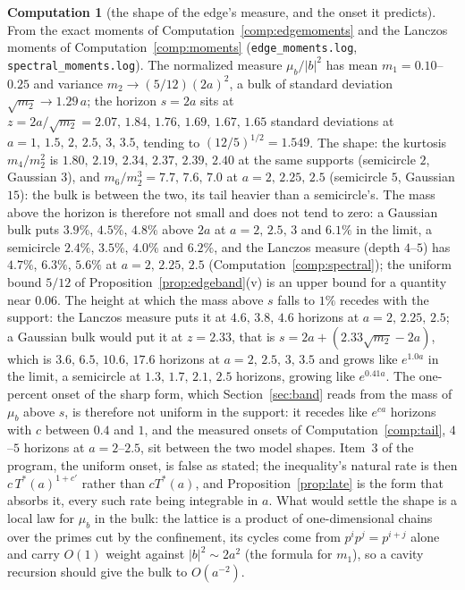 \documentclass[11pt]{article}
\theoremstyle{definition}
\newtheorem{computation}[theorem]{Computation}
\theoremstyle{remark}
\newcommand{\Tst}{T^{*}}
\begin{document}
\begin{computation}[the shape of the edge's measure, and the onset it predicts]\label{comp:shape}
From the exact moments of Computation~\ref{comp:edgemoments} and the Lanczos moments of Computation~\ref{comp:moments} (\texttt{edge\_moments.log}, \texttt{spectral\_moments.log}). The normalized measure $\mu_b/|b|^2$ has mean $m_1=0.10$--$0.25$ and variance $m_2\to(5/12)(2a)^2$, a bulk of standard deviation $\sqrt{m_2}\to1.29\,a$; the horizon $s=2a$ sits at $z=2a/\sqrt{m_2}=2.07,\,1.84,\,1.76,\,1.69,\,1.67,\,1.65$ standard deviations at $a=1,\,1.5,\,2,\,2.5,\,3,\,3.5$, tending to $(12/5)^{1/2}=1.549$. The shape: the kurtosis $m_4/m_2^2$ is $1.80,\,2.19,\,2.34,\,2.37,\,2.39,\,2.40$ at the same supports (semicircle $2$, Gaussian $3$), and $m_6/m_2^3=7.7,\,7.6,\,7.0$ at $a=2,\,2.25,\,2.5$ (semicircle $5$, Gaussian $15$): the bulk is between the two, its tail heavier than a semicircle's. The mass above the horizon is therefore not small and does not tend to zero: a Gaussian bulk puts $3.9\%$, $4.5\%$, $4.8\%$ above $2a$ at $a=2,\,2.5,\,3$ and $6.1\%$ in the limit, a semicircle $2.4\%$, $3.5\%$, $4.0\%$ and $6.2\%$, and the Lanczos measure (depth $4$--$5$) has $4.7\%$, $6.3\%$, $5.6\%$ at $a=2,\,2.25,\,2.5$ (Computation~\ref{comp:spectral}); the uniform bound $5/12$ of Proposition~\ref{prop:edgeband}(v) is an upper bound for a quantity near $0.06$. The height at which the mass above $s$ falls to $1\%$ recedes with the support: the Lanczos measure puts it at $4.6,\,3.8,\,4.6$ horizons at $a=2,\,2.25,\,2.5$; a Gaussian bulk would put it at $z=2.33$, that is $s=2a+(2.33\sqrt{m_2}-2a)$, which is $3.6,\,6.5,\,10.6,\,17.6$ horizons at $a=2,\,2.5,\,3,\,3.5$ and grows like $e^{1.0a}$ in the limit, a semicircle at $1.3,\,1.7,\,2.1,\,2.5$ horizons, growing like $e^{0.41a}$. The one-percent onset of the sharp form, which Section~\ref{sec:band} reads from the mass of $\mu_b$ above $s$, is therefore not uniform in the support: it recedes like $e^{ca}$ horizons with $c$ between $0.4$ and $1$, and the measured onsets of Computation~\ref{comp:tail}, $4$--$5$ horizons at $a=2$--$2.5$, sit between the two model shapes. Item~3 of the program, the uniform onset, is false as stated; the inequality's natural rate is then $c\,\Tst(a)^{1+c'}$ rather than $c\Tst(a)$, and Proposition~\ref{prop:late} is the form that absorbs it, every such rate being integrable in $a$. What would settle the shape is a local law for $\mu_b$ in the bulk: the lattice is a product of one-dimensional chains over the primes cut by the confinement, its cycles come from $p^ip^j=p^{i+j}$ alone and carry $O(1)$ weight against $|b|^2\sim2a^2$ (the formula for $m_1$), so a cavity recursion should give the bulk to $O(a^{-2})$.
\end{computation}
\end{document}
